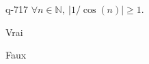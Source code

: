 \begin{truefalse}{q-717}
$\forall n \in \mathbb N,\: |1/\cos(n)|\geq 1$.
\item* Vrai
\item Faux
\end{truefalse}

